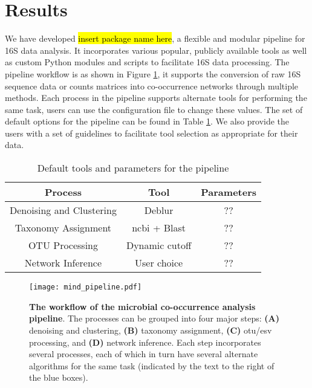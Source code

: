
\section*{Results}

  We have developed \hl{insert package name here}, a flexible and modular pipeline for 16S data analysis.
  It incorporates various popular, publicly available tools as well as custom Python modules and scripts to facilitate 16S data processing.
  The pipeline workflow is as shown in Figure \ref{fig:mind_pipeline}, it supports the conversion of raw 16S sequence data or counts matrices into co-occurrence networks through multiple methods.
  Each process in the pipeline supports alternate tools for performing the same task, users can use the configuration file to change these values.
  The set of default options for the pipeline can be found in Table \ref{table:default_options}.
  We also provide the users with a set of guidelines to facilitate tool selection as appropriate for their data.

  \begin{table}[h]
    \centering
    \small
    \begin{tabular}{|c|c|c|}
      \hline
      \textbf{Process} & \textbf{Tool} & \textbf{Parameters} \\
      \hline
      Denoising and Clustering & Deblur & ?? \\
      Taxonomy Assignment & \ac{ncbi} + Blast & ?? \\
      OTU Processing & Dynamic cutoff & ?? \\
      Network Inference & User choice & ?? \\
      \hline
    \end{tabular}
    \caption{Default tools and parameters for the pipeline}
    \label{table:default_options}
  \end{table}

  \begin{figure}[h]
    \centering
    \texttt{[image: mind\_pipeline.pdf]}
    \caption{
      \textbf{The workflow of the microbial co-occurrence analysis pipeline}.
      The processes can be grouped into four major steps: \textbf{(A)} denoising and clustering, \textbf{(B)} taxonomy assignment, \textbf{(C)} \ac{otu}/\ac{esv} processing, and \textbf{(D)} network inference.
      Each step incorporates several processes, each of which in turn have several alternate algorithms for the same task (indicated by the text to the right of the blue boxes).
    }%
    \label{fig:mind_pipeline}
  \end{figure}

